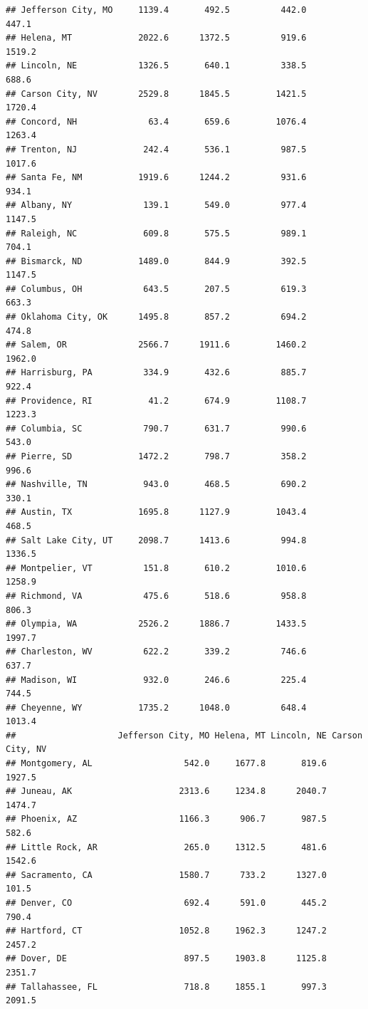 \documentclass[
]{article}
\begin{document}
\begin{verbatim}
## Jefferson City, MO     1139.4       492.5          442.0       447.1
## Helena, MT             2022.6      1372.5          919.6      1519.2
## Lincoln, NE            1326.5       640.1          338.5       688.6
## Carson City, NV        2529.8      1845.5         1421.5      1720.4
## Concord, NH              63.4       659.6         1076.4      1263.4
## Trenton, NJ             242.4       536.1          987.5      1017.6
## Santa Fe, NM           1919.6      1244.2          931.6       934.1
## Albany, NY              139.1       549.0          977.4      1147.5
## Raleigh, NC             609.8       575.5          989.1       704.1
## Bismarck, ND           1489.0       844.9          392.5      1147.5
## Columbus, OH            643.5       207.5          619.3       663.3
## Oklahoma City, OK      1495.8       857.2          694.2       474.8
## Salem, OR              2566.7      1911.6         1460.2      1962.0
## Harrisburg, PA          334.9       432.6          885.7       922.4
## Providence, RI           41.2       674.9         1108.7      1223.3
## Columbia, SC            790.7       631.7          990.6       543.0
## Pierre, SD             1472.2       798.7          358.2       996.6
## Nashville, TN           943.0       468.5          690.2       330.1
## Austin, TX             1695.8      1127.9         1043.4       468.5
## Salt Lake City, UT     2098.7      1413.6          994.8      1336.5
## Montpelier, VT          151.8       610.2         1010.6      1258.9
## Richmond, VA            475.6       518.6          958.8       806.3
## Olympia, WA            2526.2      1886.7         1433.5      1997.7
## Charleston, WV          622.2       339.2          746.6       637.7
## Madison, WI             932.0       246.6          225.4       744.5
## Cheyenne, WY           1735.2      1048.0          648.4      1013.4
##                    Jefferson City, MO Helena, MT Lincoln, NE Carson City, NV
## Montgomery, AL                  542.0     1677.8       819.6          1927.5
## Juneau, AK                     2313.6     1234.8      2040.7          1474.7
## Phoenix, AZ                    1166.3      906.7       987.5           582.6
## Little Rock, AR                 265.0     1312.5       481.6          1542.6
## Sacramento, CA                 1580.7      733.2      1327.0           101.5
## Denver, CO                      692.4      591.0       445.2           790.4
## Hartford, CT                   1052.8     1962.3      1247.2          2457.2
## Dover, DE                       897.5     1903.8      1125.8          2351.7
## Tallahassee, FL                 718.8     1855.1       997.3          2091.5

\end{verbatim}
\end{document}
